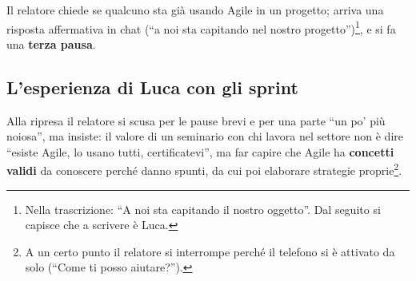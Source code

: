 Il relatore chiede se qualcuno sta già usando Agile in un progetto; arriva una
risposta affermativa in chat (``a noi sta capitando nel nostro
progetto'')\footnote{Nella trascrizione: ``A noi sta capitando il nostro
oggetto''. Dal seguito si capisce che a scrivere è Luca.}, e si fa una
\textbf{terza pausa}.

\subsection{L'esperienza di Luca con gli sprint}

Alla ripresa il relatore si scusa per le pause brevi e per una parte ``un po' più
noiosa'', ma insiste: il valore di un seminario con chi lavora nel settore non è
dire ``esiste Agile, lo usano tutti, certificatevi'', ma far capire che Agile ha
\textbf{concetti validi} da conoscere perché danno spunti, da cui poi elaborare
strategie proprie\footnote{A un certo punto il relatore si interrompe perché il
telefono si è attivato da solo (``Come ti posso aiutare?'').}.


